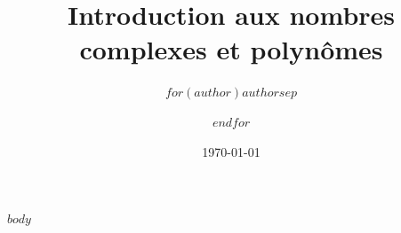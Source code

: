\documentclass{livrejs}
\title{Introduction aux nombres\\[2pt]
       complexes et polynômes}
\author{$for(author)$$author$$sep$ \and $endfor$}
\date{\today}
\begin{document}
$body$
\end{document}
